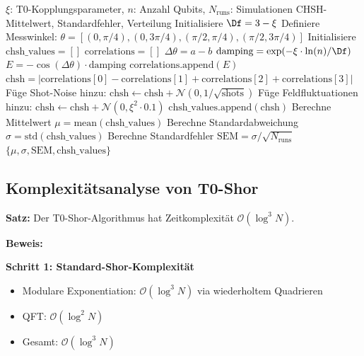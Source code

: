 \begin{algorithm}[H]
	\caption{Monte-Carlo Bell Test Simulation}
	\begin{algorithmic}[1]
		\REQUIRE $\xi$: T0-Kopplungsparameter, $n$: Anzahl Qubits, $N_{\text{runs}}$: Simulationen
		\ENSURE CHSH-Mittelwert, Standardfehler, Verteilung
		\STATE Initialisiere $\Df = 3 - \xi$
		\STATE Definiere Messwinkel: $\theta = [(0, \pi/4), (0, 3\pi/4), (\pi/2, \pi/4), (\pi/2, 3\pi/4)]$
		\STATE Initialisiere $\text{chsh\_values} = []$
		\STATE $\text{correlations} = []$
		\STATE $\Delta\theta = a - b$
		\STATE $\text{damping} = \exp(-\xi \cdot \ln(n) / \Df)$
		\STATE $E = -\cos(\Delta\theta) \cdot \text{damping}$ 
		\STATE $\text{correlations.append}(E)$
		\ENDFOR
		\STATE $\text{chsh} = |\text{correlations}[0] - \text{correlations}[1] + \text{correlations}[2] + \text{correlations}[3]|$
		\STATE Füge Shot-Noise hinzu: $\text{chsh} \leftarrow \text{chsh} + \mathcal{N}(0, 1/\sqrt{\text{shots}})$
		\STATE Füge Feldfluktuationen hinzu: $\text{chsh} \leftarrow \text{chsh} + \mathcal{N}(0, \xi^2 \cdot 0.1)$
		\STATE $\text{chsh\_values.append}(\text{chsh})$
		\ENDFOR
		\STATE Berechne Mittelwert $\mu = \text{mean}(\text{chsh\_values})$
		\STATE Berechne Standardabweichung $\sigma = \text{std}(\text{chsh\_values})$
		\STATE Berechne Standardfehler $\text{SEM} = \sigma / \sqrt{N_{\text{runs}}}$
		\RETURN $\{\mu, \sigma, \text{SEM}, \text{chsh\_values}\}$
	\end{algorithmic}
\end{algorithm}

\subsection{Komplexitätsanalyse von T0-Shor}
\label{app:complexity}

\textbf{Satz:} Der T0-Shor-Algorithmus hat Zeitkomplexität $\mathcal{O}(\log^3 N)$.

\textbf{Beweis:}

\textbf{Schritt 1: Standard-Shor-Komplexität}
\begin{itemize}
	\item Modulare Exponentiation: $\mathcal{O}(\log^3 N)$ via wiederholtem Quadrieren
	\item QFT: $\mathcal{O}(\log^2 N)$
	\item Gesamt: $\mathcal{O}(\log^3 N)$
\end{itemize}

